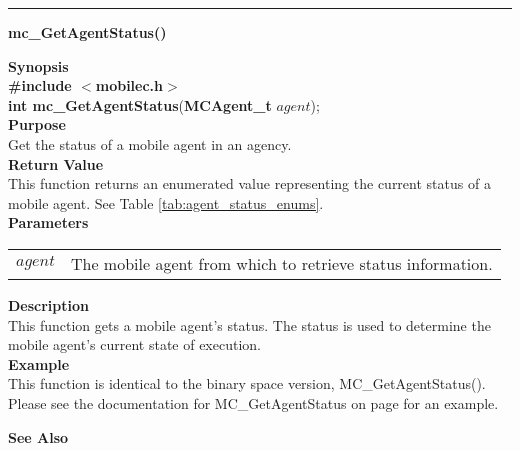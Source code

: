 \noindent
\vspace{5pt}
\rule{6.5in}{0.015in}
\noindent
{\LARGE \bf mc\_GetAgentStatus()}\\
{}

\noindent
{\bf Synopsis}\\
{\bf \#include $<$mobilec.h$>$}\\
{\bf int mc\_GetAgentStatus}({\bf MCAgent\_t} $agent$);\\

\noindent
{\bf Purpose}\\
Get the status of a mobile agent in an agency.\\

\noindent
{\bf Return Value}\\
This function returns an enumerated value representing the current
status of a mobile agent. See Table \vref{tab:agent_status_enums}.\\

\noindent
{\bf Parameters}
\vspace{-0.1in}
\begin{description}
\item
\begin{tabular}{p{10 mm}p{145 mm}}
$agent$ & The mobile agent from which to retrieve status information.
\end{tabular}
\end{description}

\noindent
{\bf Description}\\
This function gets a mobile agent's status. 
The status is used to determine the mobile agent's current state of execution.\\

\noindent
{\bf Example}\\
This function is identical to the binary space version, MC\_GetAgentStatus().
Please see the documentation for MC\_GetAgentStatus on page 
\pageref{api:MC_GetAgentStatus} for an example.
\noindent

\noindent
{\bf See Also}\\

